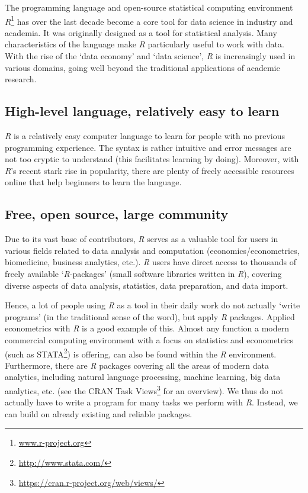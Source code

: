 \documentclass[
  12pt,
]{style/krantz}
\renewcommand{\href}[2]{#2\footnote{\url{#1}}}
\begin{document}
The programming language and open-source statistical computing environment \href{www.r-project.org}{\emph{R}} has over the last decade become a core tool for data science in industry and academia. It was originally designed as a tool for statistical analysis. Many characteristics of the language make \emph{R} particularly useful to work with data. With the rise of the `data economy' and `data science', \emph{R} is increasingly used in various domains, going well beyond the traditional applications of academic research.

\hypertarget{high-level-language-relatively-easy-to-learn}{%
\subsection{High-level language, relatively easy to learn}\label{high-level-language-relatively-easy-to-learn}}

\emph{R} is a relatively easy computer language to learn for people with no previous programming experience. The syntax is rather intuitive and error messages are not too cryptic to understand (this facilitates learning by doing). Moreover, with \emph{R}'s recent stark rise in popularity, there are plenty of freely accessible resources online that help beginners to learn the language.

\hypertarget{free-open-source-large-community}{%
\subsection{Free, open source, large community}\label{free-open-source-large-community}}

Due to its vast base of contributors, \emph{R} serves as a valuable tool for users in various fields related to data analysis and computation (economics/econometrics, biomedicine, business analytics, etc.). \emph{R} users have direct access to thousands of freely available `\emph{R}-packages' (small software libraries written in \emph{R}), covering diverse aspects of data analysis, statistics, data preparation, and data import.

Hence, a lot of people using \emph{R} as a tool in their daily work do not actually `write programs' (in the traditional sense of the word), but apply \emph{R} packages. Applied econometrics with \emph{R} is a good example of this. Almost any function a modern commercial computing environment with a focus on statistics and econometrics (such as \href{http://www.stata.com/}{STATA}) is offering, can also be found within the \emph{R} environment. Furthermore, there are \emph{R} packages covering all the areas of modern data analytics, including natural language processing, machine learning, big data analytics, etc. (see the \href{https://cran.r-project.org/web/views/}{CRAN Task Views} for an overview). We thus do not actually have to write a program for many tasks we perform with \emph{R}. Instead, we can build on already existing and reliable packages.
\end{document}
